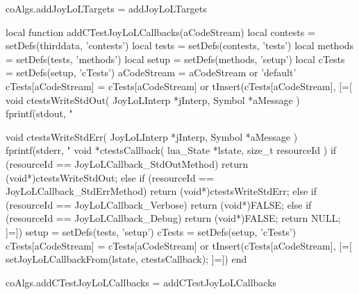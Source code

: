 coAlgs.addJoyLoLTargets = addJoyLoLTargets
\stopLuaCode

\startMkIVCode
\def\addCTestJoyLoLCallbacks#1{
  \directlua{
    thirddata.joylolCoAlgs.addCTestJoyLoLCallbacks('#1')
  }
}
\stopMkIVCode

\startLuaCode
local function addCTestJoyLoLCallbacks(aCodeStream)
  local contests      = setDefs(thirddata, 'contests')
  local tests         = setDefs(contests, 'tests')
  local methods       = setDefs(tests, 'methods')
  local setup         = setDefs(methods, 'setup')
  local cTests        = setDefs(setup, 'cTests')
  aCodeStream         = aCodeStream         or 'default'
  cTests[aCodeStream] = cTests[aCodeStream] or { }
  tInsert(cTests[aCodeStream], [=[
void ctestsWriteStdOut(
  JoyLoLInterp *jInterp,
  Symbol       *aMessage
) {
  fprintf(stdout, "%
}

void ctestsWriteStdErr(
  JoyLoLInterp *jInterp,
  Symbol       *aMessage
) {
  fprintf(stderr, "%
}
void *ctestsCallback(
  lua_State *lstate,
  size_t resourceId
) {
  if (resourceId == JoyLoLCallback_StdOutMethod) {
    return (void*)ctestsWriteStdOut;
  } else if (resourceId == JoyLoLCallback_StdErrMethod) {
    return (void*)ctestsWriteStdErr;
  } else if (resourceId == JoyLoLCallback_Verbose) {
    return (void*)FALSE;
  } else if (resourceId == JoyLoLCallback_Debug) {
    return (void*)FALSE;
  }
  return NULL;
} 
]=])
  setup               = setDefs(tests, 'setup')
  cTests              = setDefs(setup, 'cTests')
  cTests[aCodeStream] = cTests[aCodeStream] or { }
  tInsert(cTests[aCodeStream], [=[
setJoyLoLCallbackFrom(lstate, ctestsCallback);
]=])
end

coAlgs.addCTestJoyLoLCallbacks = addCTestJoyLoLCallbacks
\stopLuaCode

\startMkIVCode
\def\setJoylolVerboseOn{
  \directlua{thirddata.joylol.setVerbose(true)}
}

\def\setJoylolVerboseOff{
  \directlua{thirddata.joylol.setVerbose(false)}
}

\def\setJoylolDebuggingOn{
  \directlua{thirddata.joylol.setDebugging(true)}
}

\def\setJoylolDebuggingOff{
  \directlua{thirddata.joylol.setVDebugging(false)}
}

\def\setJoylolTracingOn{
  \directlua{thirddata.joylol.setTracing(true)}
}

\def\setJoylolTracingOff{
  \directlua{thirddata.joylol.setTracing(false)}
}

\def\setJoylolShowStackOn{
  \directlua{thirddata.joylol.setShowStack(true)}
}

